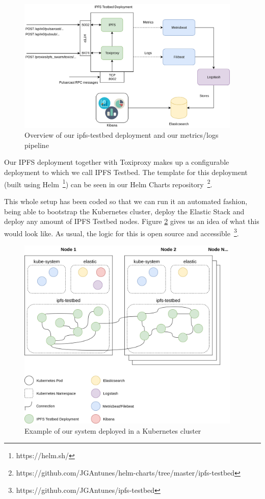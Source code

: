 \begin{figure}[hb!]
  \centering
  \includegraphics[width=0.95\textwidth]{img/ipfs-testbed-and-metrics.png}
  \caption{Overview of our ipfs-testbed deployment and our metrics/logs
  pipeline}
  \label{fig:ipfs-testbed-and-metrics}
\end{figure}

Our IPFS deployment together with Toxiproxy makes up a configurable deployment
to which we call IPFS Testbed. The template for this deployment (built using
Helm~\footnote{https://helm.sh/}) can be seen in our Helm Charts
repository~\footnote{https://github.com/JGAntunes/helm-charts/tree/master/ipfs-testbed}.

This whole setup has been coded so that we can run it an automated fashion,
being able to bootstrap the Kubernetes cluster, deploy the Elastic Stack and
deploy any amount of IPFS Testbed nodes. Figure
\ref{fig:ipfs-testbed-kubernetes-overview} gives us an idea of what this would
look like. As usual, the logic for this is open source and
accessible~\footnote{https://github.com/JGAntunes/ipfs-testbed}.

\begin{figure}[hb!]
  \centering
  \includegraphics[width=0.95\textwidth]{img/ipfs-testbed-kubernetes-overview.png}
  \caption{Example of our system deployed in a Kubernetes cluster}
  \label{fig:ipfs-testbed-kubernetes-overview}
\end{figure}

